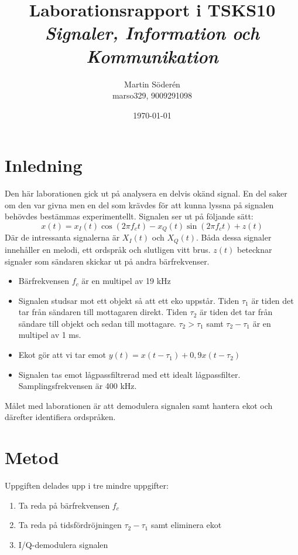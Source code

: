 \documentclass[10pt,twocolumn]{article}
\title{Laborationsrapport i TSKS10 \emph{Signaler, Information och Kommunikation}}
\author{Martin Söderén \\ marso329, 9009291098 }
\date{\today}
\begin{document}
\maketitle

\clearpage

\section{Inledning}

Den här laborationen gick ut på analysera en delvis okänd signal. En del saker om den var givna men en del som krävdes för att kunna lyssna på signalen behövdes bestämmas experimentellt. Signalen ser ut på följande sätt:
$$x(t)=x_I(t)\cos(2\pi f_c t)-x_Q(t)\sin(2\pi f_c t)+z(t)$$
Där de intressanta signalerna är $X_I(t)$ och $X_Q(t)$. Båda dessa signaler innehåller en melodi, ett ordspråk och slutligen vitt brus. $z(t)$ betecknar signaler som sändaren skickar ut på andra bärfrekvenser.

\begin{itemize}
\item Bärfrekvensen $f_c$ är en multipel av 19 kHz
\item Signalen studsar mot ett objekt så att ett eko uppstår. Tiden $\tau_1$ är tiden det tar från sändaren till mottagaren direkt. Tiden $\tau_2$ är tiden det tar från sändare till objekt och sedan till mottagare. $\tau_2>\tau_1$ samt $\tau_2-\tau_1$ är en multipel av 1 ms. 
\item Ekot gör att vi tar emot $y(t)=x(t-\tau_1)+0,9x(t-\tau_2)$
\item Signalen tas emot lågpassfiltrerad med ett idealt lågpassfilter. Samplingsfrekvensen är 400 kHz.
\end{itemize}

Målet med laborationen är att demodulera signalen samt hantera ekot och därefter identifiera ordspråken.

\section{Metod}

Uppgiften delades upp i tre mindre uppgifter:

\begin{enumerate}
\item Ta reda på bärfrekvensen $f_c$
\item Ta reda på tidsfördröjningen $\tau_2-\tau_1$ samt eliminera ekot
\item I/Q-demodulera signalen
\end{enumerate}
\end{document}

